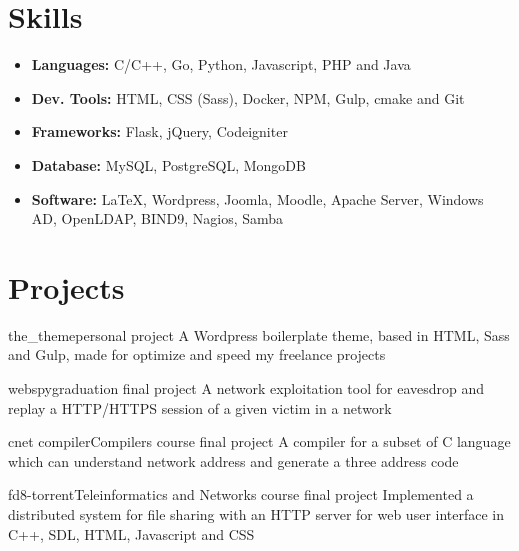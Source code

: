 \documentclass{cv}
\begin{document}
  \section{Skills}
  \begin{itemize}
    \item[] \textbf{Languages:} C/C++, Go, Python, Javascript, PHP and Java
    \item[] \textbf{Dev. Tools:} HTML, CSS (Sass), Docker, NPM, Gulp, cmake and Git
    \item[] \textbf{Frameworks:} Flask, jQuery, Codeigniter
    \item[] \textbf{Database:} MySQL, PostgreSQL, MongoDB
    \item[] \textbf{Software:} \LaTeX, Wordpress, Joomla, Moodle, Apache Server, Windows AD, OpenLDAP, BIND9, Nagios, Samba
  \end{itemize}

  \section{Projects}
  \begin{chronoitem}{the\_theme}{personal project}{}
    A Wordpress boilerplate theme, based in HTML, Sass and Gulp, made for optimize and speed my freelance projects
  \end{chronoitem}

  \begin{chronoitem}{webspy}{graduation final project}{}
    A network exploitation tool for eavesdrop and replay a HTTP/HTTPS session of a given victim in a network
  \end{chronoitem}

  \begin{chronoitem}{cnet compiler}{Compilers course final project}{}
    A compiler for a subset of C language which can understand network address and generate a three address code
  \end{chronoitem}

  \begin{chronoitem}{fd8-torrent}{Teleinformatics and Networks course final project}{}
    Implemented a distributed system for file sharing with an HTTP server for web user interface in C++, SDL, HTML, Javascript and CSS
  \end{chronoitem}
\end{document}
